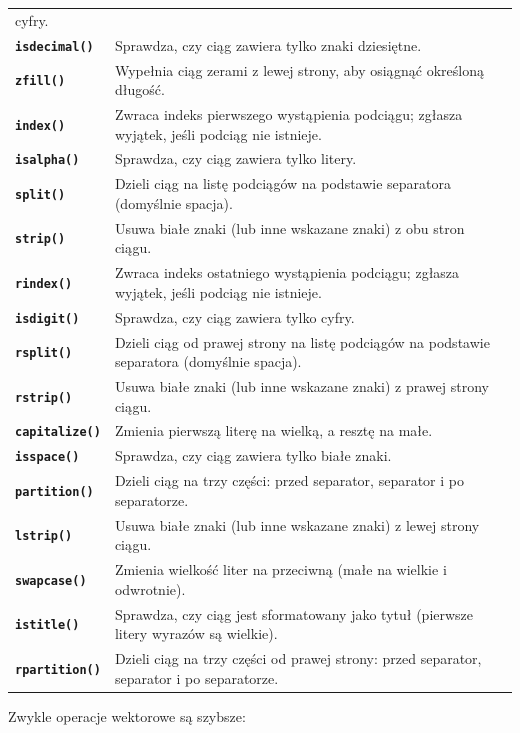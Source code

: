 \documentclass[
  polish,
  letterpaper,
  DIV=11,
  numbers=noendperiod]{scrreprt}
\begin{document}
\begin{longtable}[]{@{}
  >{\raggedright\arraybackslash}p{}
  >{\raggedright\arraybackslash}p{}@{}}
cyfry. \\
\textbf{\texttt{isdecimal()}} & Sprawdza, czy ciąg zawiera tylko znaki
dziesiętne. \\
\textbf{\texttt{zfill()}} & Wypełnia ciąg zerami z lewej strony, aby
osiągnąć określoną długość. \\
\textbf{\texttt{index()}} & Zwraca indeks pierwszego wystąpienia
podciągu; zgłasza wyjątek, jeśli podciąg nie istnieje. \\
\textbf{\texttt{isalpha()}} & Sprawdza, czy ciąg zawiera tylko
litery. \\
\textbf{\texttt{split()}} & Dzieli ciąg na listę podciągów na podstawie
separatora (domyślnie spacja). \\
\textbf{\texttt{strip()}} & Usuwa białe znaki (lub inne wskazane znaki)
z obu stron ciągu. \\
\textbf{\texttt{rindex()}} & Zwraca indeks ostatniego wystąpienia
podciągu; zgłasza wyjątek, jeśli podciąg nie istnieje. \\
\textbf{\texttt{isdigit()}} & Sprawdza, czy ciąg zawiera tylko cyfry. \\
\textbf{\texttt{rsplit()}} & Dzieli ciąg od prawej strony na listę
podciągów na podstawie separatora (domyślnie spacja). \\
\textbf{\texttt{rstrip()}} & Usuwa białe znaki (lub inne wskazane znaki)
z prawej strony ciągu. \\
\textbf{\texttt{capitalize()}} & Zmienia pierwszą literę na wielką, a
resztę na małe. \\
\textbf{\texttt{isspace()}} & Sprawdza, czy ciąg zawiera tylko białe
znaki. \\
\textbf{\texttt{partition()}} & Dzieli ciąg na trzy części: przed
separator, separator i po separatorze. \\
\textbf{\texttt{lstrip()}} & Usuwa białe znaki (lub inne wskazane znaki)
z lewej strony ciągu. \\
\textbf{\texttt{swapcase()}} & Zmienia wielkość liter na przeciwną (małe
na wielkie i odwrotnie). \\
\textbf{\texttt{istitle()}} & Sprawdza, czy ciąg jest sformatowany jako
tytuł (pierwsze litery wyrazów są wielkie). \\
\textbf{\texttt{rpartition()}} & Dzieli ciąg na trzy części od prawej
strony: przed separator, separator i po separatorze. \\
\end{longtable}

Zwykle operacje wektorowe są szybsze:
\end{document}
